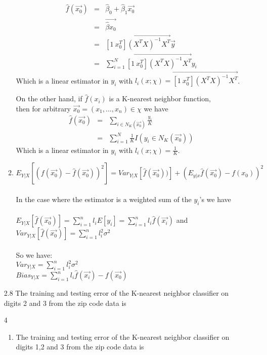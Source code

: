 \documentclass{article}
\begin{document}
\begin{enumerate}
\begin{enumerate}
        \begin{eqnarray*}
          \hat{f}(\vec{x_0}) &=& \hat{\beta}_0 + \hat{\beta}_1\vec{x_0} \\
                             &=& \vec{\hat{\beta}x_0} \\
                             &=& \vec{[1\:x_0^T](X^TX)^{-1}X^T}\vec{y} \\
                             &=& \sum\limits_{i=1}^{N}\vec{[1\:x_0^T](X^TX)^{-1}X^T}y_i
        \end{eqnarray*}
        Which is a linear estimator in $y_i$ with $l_i(x;\chi) = \vec{[1\:x_0^T](X^TX)^{-1}X^T}$.
        
        On the other hand, if $\hat{f}(x_i)$ is a K-nearest neighbor function, \\ then for arbitrary $\vec{x_0}=(x_1,\dots,x_n)\in\chi$ we have
        \begin{eqnarray*}
          \hat{f}(\vec{x_0}) &=& \sum\limits_{i\in N_{K}(\vec{x_0})}\frac{y_i}{K} \\
                             &=& \sum\limits_{i=1}^{N}\frac{1}{K}I(y_i \in N_K(\vec{x_0}))
        \end{eqnarray*}
        Which is a linear estimator in $y_i$ with $l_i(x;\chi) =\frac{1}{K}$.
        \newpage
      \item $E_{Y|X}\left[(f(\vec{x_0}) - \hat{f}(\vec{x_0}))^2\right] = Var_{Y|X}\left[\hat{f}(\vec{x_0}))\right] + \left(E_{y|x}\hat{f}(\vec{x_0})-f(x_0)\right)^2$ \\\\
      
      In the case where the estimator is a weighted sum of the $y_i$'s we have \\\\    
      $E_{Y|X}\left[\hat{f}(\vec{x_0})\right] = \sum\limits_{i=1}^{n}l_iE[y_i] = \sum\limits_{i=1}^{n}l_i\hat{f}(\vec{x_i})$ and $Var_{Y|X}\left[\hat{f}(\vec{x_0})\right] = \sum\limits_{i=1}^{n}l_i^2\sigma^2$ \\\\
      So we have:\\
      $Var_{Y|X} = \sum\limits_{i=1}^{n}l_i^2\sigma^2$\\
      $Bias_{Y|X} = \sum\limits_{i=1}^{n}l_i\hat{f}(\vec{x_i}) - f(\vec{x_0})$
    \end{enumerate}
    
  \item[2.8] The training and testing error of the K-nearest neighbor classifier on digits 2 and 3 from the zip code data is
  \item[4]
    \begin{enumerate}
      \item The training and testing error of the K-nearest neighbor classifier on digits 1,2 and 3 from the zip code data is


\end{enumerate}
\end{enumerate}
\end{document}
